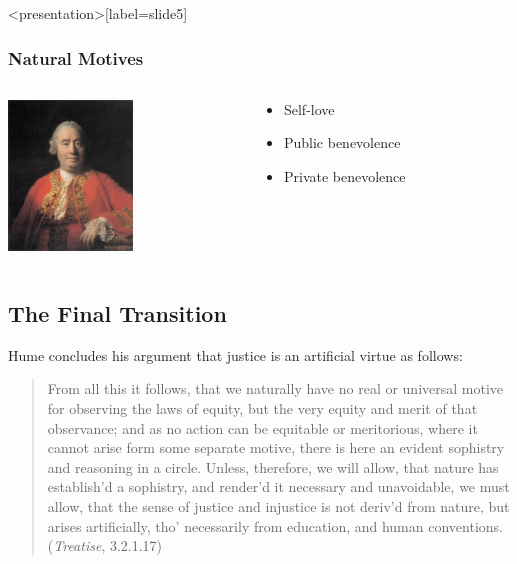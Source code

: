 \begin{frame}<presentation>[label=slide5]
    \frametitle{Natural Motives}
        \begin{columns}
            \begin{column}{3cm}
                \includegraphics[height=4cm]{../../../graphics/hume.jpg}
            \end{column}
            \begin{column}{7cm}
                \begin{itemize}
                    \item Self-love
                    \item Public benevolence
                    \item Private benevolence
                \end{itemize}
            \end{column}
        \end{columns}
\end{frame}


\subsection{The Final Transition}\label{sec:the_final_transition} %

Hume concludes his argument that justice is an artificial virtue as follows:
\begin{quote}
    From all this it follows, that we naturally have no real or universal motive for observing the laws of equity, but the very equity and merit of that observance; and as no action can be equitable or meritorious, where it cannot arise form some separate motive, there is here an evident sophistry and reasoning in a circle. Unless, therefore, we will allow, that nature has establish’d a sophistry, and render’d it necessary and unavoidable, we must allow, that the sense of justice and injustice is not deriv’d from nature, but arises artificially, tho’ necessarily from education, and human conventions. (\emph{Treatise}, 3.2.1.17)
\end{quote}

